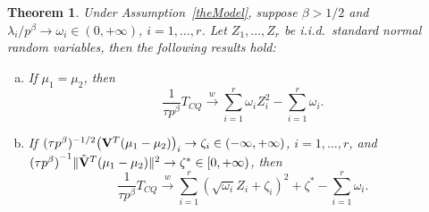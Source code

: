 \documentclass[3p]{elsarticle}
\theoremstyle{plain}
\newtheorem{theorem}{\quad\quad Theorem}
\theoremstyle{definition}
\theoremstyle{remark}
\begin{document}
\begin{theorem}\label{Chenstheory2}
 Under Assumption~\ref{theModel},
    suppose $\beta>1/2$ and $\lambda_i/p^\beta \to \omega_i\in(0,+\infty)$, $i=1,\ldots,r$.
    Let $Z_1,\ldots,Z_{r}$ be i.i.d.\ standard normal random variables,
     then the following results hold:
     \begin{enumerate}[(a)]
         \item
             If $\mu_1=\mu_2$, then
    $$
        \frac{1}{\tau p^{\beta}} T_{CQ}
        \xrightarrow{w}
        \sum_{i=1}^r \omega_i Z_i^2
            -
        \sum_{i=1}^r \omega_i.
    $$
         \item
             If $(\tau p^{\beta})^{-1/2}\big(\mathbf{V}^T (\mu_1-\mu_2)\big)_i\to \zeta_i\in(-\infty,+\infty)$, $i=1,\ldots,r$,
             and
    ${(\tau p^\beta)}^{-1}\|\tilde{\mathbf{V}}^T (\mu_1-\mu_2)\|^2\to \zeta^*\in [0,+\infty)$, then
    $$
        \frac{1}{\tau p^{\beta}} T_{CQ}
        \xrightarrow{w}
        \sum_{i=1}^r (\sqrt{\omega_i} Z_i+\zeta_i)^2+
\zeta^*
        -
        \sum_{i=1}^r \omega_i.
    $$
     \end{enumerate}
\end{theorem}
\end{document}
